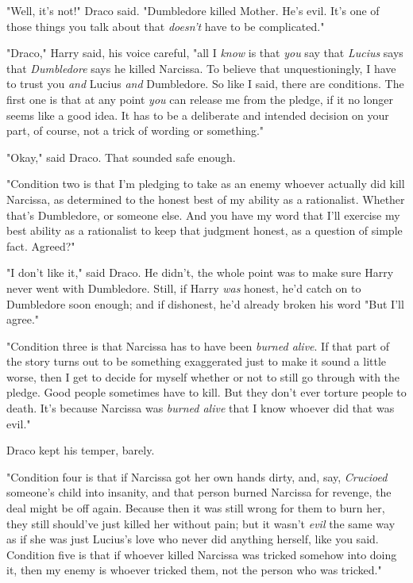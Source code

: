 "Well, it's not!" Draco said. "Dumbledore killed Mother. He's evil. It's one of
those things you talk about that \emph{doesn't} have to be complicated."

"Draco," Harry said, his voice careful, "all I \emph{know} is that \emph{you}
say that \emph{Lucius} says that \emph{Dumbledore} says he killed Narcissa. To
believe that unquestioningly, I have to trust you \emph{and} Lucius \emph{and}
Dumbledore. So like I said, there are conditions. The first one is that at any
point \emph{you} can release me from the pledge, if it no longer seems like a
good idea. It has to be a deliberate and intended decision on your part, of
course, not a trick of wording or something."

"Okay," said Draco. That sounded safe enough.

"Condition two is that I'm pledging to take as an enemy whoever actually did
kill Narcissa, as determined to the honest best of my ability as a rationalist.
Whether that's Dumbledore, or someone else. And you have my word that I'll
exercise my best ability as a rationalist to keep that judgment honest, as a
question of simple fact. Agreed?"

"I don't like it," said Draco. He didn't, the whole point was to make sure
Harry never went with Dumbledore. Still, if Harry \emph{was} honest, he'd catch
on to Dumbledore soon enough; and if dishonest, he'd already broken his
word{\el} "But I'll agree."

"Condition three is that Narcissa has to have been \emph{burned alive}. If that
part of the story turns out to be something exaggerated just to make it sound a
little worse, then I get to decide for myself whether or not to still go
through with the pledge. Good people sometimes have to kill. But they don't
ever torture people to death. It's because Narcissa was \emph{burned alive}
that I know whoever did that was evil."

Draco kept his temper, barely.

"Condition four is that if Narcissa got her own hands dirty, and, say,
\emph{Crucioed} someone's child into insanity, and that person burned Narcissa
for revenge, the deal might be off again. Because then it was still wrong for
them to burn her, they still should've just killed her without pain; but it
wasn't \emph{evil} the same way as if she was just Lucius's love who never did
anything herself, like you said. Condition five is that if whoever killed
Narcissa was tricked somehow into doing it, then my enemy is whoever tricked
them, not the person who was tricked."

